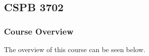 \clearpage

\renewcommand{\ChapTitle}{\CSPBCogSci}
\renewcommand{\SectionTitle}{CSPB 3702}

\chapter{\ChapTitle}
\section{\SectionTitle}

\subsection{Course Overview}

The overview of this course can be seen below.

